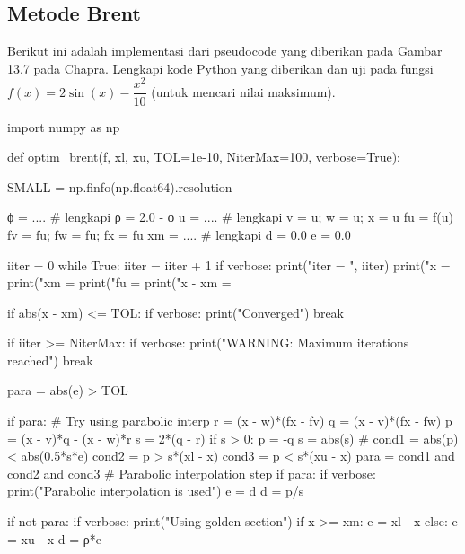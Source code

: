\subsection{Metode Brent}

\begin{soal}
Berikut ini adalah implementasi dari pseudocode yang diberikan pada
Gambar 13.7 pada Chapra.
Lengkapi kode Python yang diberikan dan uji pada fungsi
$f(x) = 2\sin(x) - \dfrac{x^2}{10}$ (untuk mencari nilai maksimum).
\end{soal}

\begin{pythoncode}
import numpy as np

def optim_brent(f, xl, xu, TOL=1e-10, NiterMax=100, verbose=True):
    
    SMALL = np.finfo(np.float64).resolution

    ϕ = .... # lengkapi
    ρ = 2.0 - ϕ
    u = .... # lengkapi
    v = u; w = u; x = u
    fu = f(u)
    fv = fu; fw = fu; fx = fu
    xm = .... # lengkapi
    d = 0.0
    e = 0.0

    iiter = 0
    while True:
        iiter = iiter + 1
        if verbose:
            print("\nBegin iter = ", iiter)
            print("x      = %
            print("xm     = %
            print("fu     = %
            print("x - xm = %

        if abs(x - xm) <= TOL:
            if verbose:
                print("Converged")
            break

        if iiter >= NiterMax:
            if verbose:
                print("WARNING: Maximum iterations reached")
            break

        para = abs(e) > TOL
        
        if para:
            # Try using parabolic interp
            r = (x - w)*(fx - fv)
            q = (x - v)*(fx - fw)
            p = (x - v)*q - (x - w)*r
            s = 2*(q - r)
            if s > 0:
                p = -q
            s = abs(s)
            #
            cond1 = abs(p) < abs(0.5*s*e)
            cond2 = p > s*(xl - x)
            cond3 = p < s*(xu - x)
            para = cond1 and cond2 and cond3
            # Parabolic interpolation step
            if para:
                if verbose:
                    print("Parabolic interpolation is used")
                e = d
                d = p/s

        if not para:
            if verbose:
                print("Using golden section")
            if x >= xm:
                e = xl - x
            else:
                e = xu - x
            d = ρ*e


\end{pythoncode}
